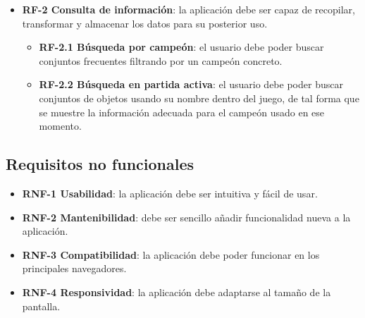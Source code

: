 \begin{itemize}
	\item \textbf{RF-2 Consulta de información}: la aplicación debe ser capaz de recopilar, transformar y almacenar los datos para su posterior uso.
	\begin{itemize}
		\item \textbf{RF-2.1 Búsqueda por campeón}: el usuario debe poder buscar conjuntos frecuentes filtrando por un campeón concreto.
		\item \textbf{RF-2.2 Búsqueda en partida activa}: el usuario debe poder buscar conjuntos de objetos usando su nombre dentro del juego, de tal forma que se muestre la información adecuada para el campeón usado en ese momento.
	\end{itemize}
\end{itemize}

\subsection{Requisitos no funcionales}
\begin{itemize}
	\item \textbf{RNF-1 Usabilidad}: la aplicación debe ser intuitiva y fácil de usar.
	\item \textbf{RNF-2 Mantenibilidad}: debe ser sencillo añadir funcionalidad nueva a la aplicación.
	\item \textbf{RNF-3 Compatibilidad}: la aplicación debe poder funcionar en	los principales navegadores.
	\item \textbf{RNF-4 Responsividad}: la aplicación debe adaptarse al tamaño	de la pantalla.
\end{itemize}